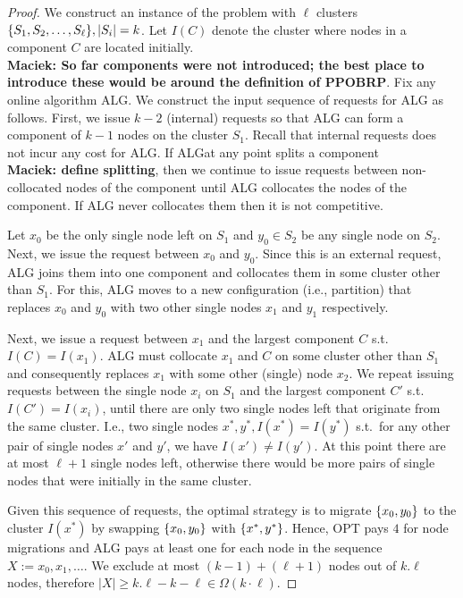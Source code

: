 \documentclass[manuscript,screen=true]{acmart}
\newcommand{\ALG}{ALG}
\newcommand{\PPOBRP}{PPOBRP}
\DeclarePairedDelimiter\set{\{}{\}}
\newcommand\maciek[1]{\color{brown}\textbf{\\ Maciek: #1}\color{black}}
\begin{document}
\begin{proof}
We construct an instance of the problem with $\ell$ clusters 
$\set{ S_1, S_2,\dots , S_{\ell}}, |S_i|  = k$.
Let $I(C)$ denote the cluster where nodes in a component $C$ are located initially.
\maciek{So far components were not introduced; the best place to introduce these would be around the definition of \PPOBRP}.
Fix any online algorithm \ALG.
We construct the input sequence of requests for \ALG{} as follows.
First,
we issue $k-2$ (internal) requests so that \ALG{} can form a component of $k-1$
nodes on the cluster $S_1$.
Recall that internal requests does not incur any cost for \ALG.
If \ALG{}at any point splits a component\maciek{define splitting}, then
we continue to issue requests between non-collocated nodes of the component until \ALG{} collocates the nodes of the component.
If \ALG{} never collocates them then it is not competitive.

Let $x_0$  be the only single node left on $S_1$ and  $y_0 \in S_2$ be any single node on $S_2$.
Next,
we issue the request between $x_0$ and $y_0$.
Since this is an external request,
ALG joins them into one component and collocates them in some cluster other than $S_1$.
For this,
ALG moves to a new configuration (i.e., partition)
that replaces $x_0$ and $y_0$ with two other single nodes $x_1$ and $y_1$ respectively.

Next,
we issue a request between $x_1$ and the largest component $C$ s.t.~$I(C) = I(x_1)$.
ALG must collocate $x_1$ and $C$ on some cluster other than $S_1$ and
consequently replaces $x_1$ with some other (single) node $x_2$.
We repeat issuing requests between the single node $x_i$ on $S_1$ and the largest component $C'$ s.t.~$I(C')=I(x_i)$,
 until there are only two single nodes left that  originate from the same cluster.
I.e.,
two single nodes $x^*, y^*,I(x^*) = I(y^*)$ s.t.~for any other pair of single nodes
$x'$ and $y'$,
we have $I(x') \neq I(y')$.
At this point there are at most $\ell+1$ single nodes left,
otherwise there would be more pairs of single nodes that were initially in the same cluster.

Given this sequence of requests,
the optimal strategy is to migrate $\set{x_0,y_0}$ to the cluster $I(x^*)$ by
 swapping $\set{x_0,y_0}$ with $\set{x^*,y^*}$.
Hence,
OPT pays $4$ for node migrations and
ALG pays at least one for each node in the sequence $X := x_0, x_1,\dots$.
We exclude at most $(k-1) + ( \ell+1)$ nodes out of $k.\ell$ nodes,
therefore $|X| \geq k.\ell - k - \ell \in \Omega(k\cdot\ell)$.
\end{proof}
\end{document}
